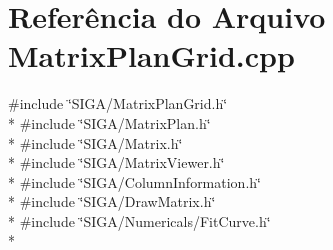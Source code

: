 \section{Referência do Arquivo Matrix\+Plan\+Grid.\+cpp}
\label{_matrix_plan_grid_8cpp}
{\ttfamily \#include \char`\"{}S\+I\+G\+A/\+Matrix\+Plan\+Grid.\+h\char`\"{}}\\*
{\ttfamily \#include \char`\"{}S\+I\+G\+A/\+Matrix\+Plan.\+h\char`\"{}}\\*
{\ttfamily \#include \char`\"{}S\+I\+G\+A/\+Matrix.\+h\char`\"{}}\\*
{\ttfamily \#include \char`\"{}S\+I\+G\+A/\+Matrix\+Viewer.\+h\char`\"{}}\\*
{\ttfamily \#include \char`\"{}S\+I\+G\+A/\+Column\+Information.\+h\char`\"{}}\\*
{\ttfamily \#include \char`\"{}S\+I\+G\+A/\+Draw\+Matrix.\+h\char`\"{}}\\*
{\ttfamily \#include \char`\"{}S\+I\+G\+A/\+Numericals/\+Fit\+Curve.\+h\char`\"{}}\\*
